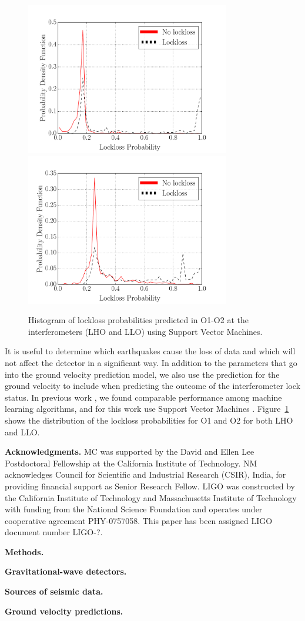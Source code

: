 \documentclass[preprint, aps, showpacs]{revtex4-1}
\begin{document}
\begin{figure}[t]
\hspace*{-0.5cm}
 \includegraphics[width=3.5in,trim = 2.5cm 1.5cm 2.5cm 1.5cm, clip=true]{lockloss_histogram_H1O1O2_GPR.pdf}
 \includegraphics[width=3.5in,trim = 2.5cm 1.5cm 2.5cm 1.5cm, clip=true]{lockloss_histogram_L1O1O2_GPR.pdf}
 \caption{Histogram of lockloss probabilities predicted in O1-O2 at the interferometers (LHO and LLO) using Support Vector Machines.}
 \label{fig:lockloss}
\end{figure}

It is useful to determine which earthquakes cause the loss of data and which will not affect the detector in a significant way.
In addition to the parameters that go into the ground velocity prediction model, we also use the prediction for the ground velocity to include when predicting the outcome of the interferometer lock status.
In previous work \cite{CoEa2017}, we found comparable performance among machine learning algorithms, and for this work use Support Vector Machines \cite{Burges_SVM}.
Figure~\ref{fig:lockloss} shows the distribution of the lockloss probabilities for O1 and O2 for both LHO and LLO. 

\textbf{Acknowledgments.}
MC was supported by the David and Ellen Lee Postdoctoral Fellowship at the California Institute of Technology.
NM acknowledges Council for Scientific and Industrial Research (CSIR), India, for providing financial support as Senior Research Fellow.  
LIGO was constructed by the California Institute of Technology and Massachusetts Institute of Technology with funding from the National Science Foundation and operates under cooperative agreement PHY-0757058.
This paper has been assigned LIGO document number LIGO-?.




\textbf{Methods.}

\textbf{Gravitational-wave detectors.}

\textbf{Sources of seismic data.}


\textbf{Ground velocity predictions.}
\end{document}
